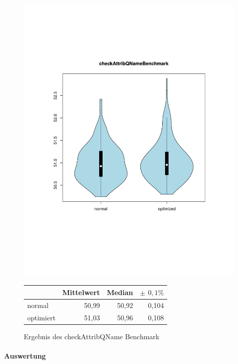 \begin{figure}[H]
{		\includegraphics[trim=20mm 60mm 0mm 50mm,scale=0.50]{pictures/vioplot_checkAttribQName.pdf}
	}

	\begin{table}[H]
	\centering
		\begin{tabular}{|l|r|r|r|}
			\hline
		   		 	  & Mittelwert & Median & \bf{$\pm$ $0,1\%$} \\
		 	\hline
		 	\hline
		  	normal & 50,99 & 50,92 & 0,104 \\
		 	optimiert & 51,03 & 50,96 & 0,108 \\ 
		  	\hline
		  	
		\end{tabular}
	\end{table}

	\caption{Ergebnis des checkAttribQName Benchmark}\label{bp:checkAttrBench}
\end{figure}

\paragraph{Auswertung}

